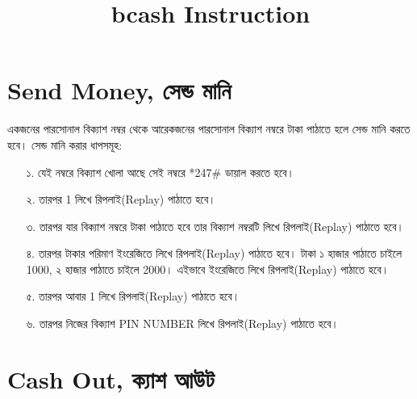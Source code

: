 \documentclass[10pt, a4paper]{article}
\title{bcash Instruction}
\begin{document}
\section*{Send Money, সেন্ড মানি}
একজনের পারসোনাল বিক্যাশ নম্বর থেকে আরেকজনের পারসোনাল বিক্যাশ নম্বরে টাকা পাঠাতে হলে সেন্ড মানি করতে হবে। সেন্ড মানি করার ধাপসমূহ: \\
\begin{enumerate}
	\item[১.] যেই নম্বরে বিক্যাশ খোলা আছে সেই নম্বরে *247\#  ডায়াল করতে হবে।
	\item[২.] তারপর 1 লিখে রিপলাই(Replay) পাঠাতে হবে।
	\item[৩.] তারপর যার বিক্যাশ নম্বরে টাকা পাঠাতে হবে তার বিক্যাশ নম্বরটি লিখে রিপলাই(Replay) পাঠাতে হবে।
	\item[৪.] তারপর টাকার পরিমাণ ইংরেজিতে লিখে রিপলাই(Replay) পাঠাতে হবে। টাকা ১ হাজার পাঠাতে চাইলে 1000, ২ হাজার পাঠাতে চাইলে 2000। এইভাবে ইংরেজিতে লিখে রিপলাই(Replay) পাঠাতে হবে।
	\item[৫.] তারপর আবার 1 লিখে রিপলাই(Replay) পাঠাতে হবে।
	\item[৬.] তারপর নিজের বিক্যাশ PIN NUMBER লিখে রিপলাই(Replay) পাঠাতে হবে।
\end{enumerate}

\section*{Cash Out, ক্যাশ আউট}
\end{document}
